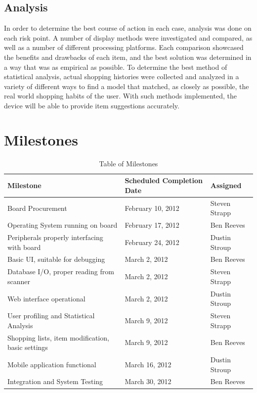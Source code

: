 \documentclass[11pt]{article} %
\begin{document}
\subsection {Analysis}
\noindent In order to determine the best course of action in each case, analysis was done on each risk point. A number of display methods were investigated and compared, as well as a number of different processing platforms. Each comparison showcased the benefits and drawbacks of each item, and the best solution was determined in a way that was as empirical as possible. To determine the best method of statistical analysis, actual shopping histories were collected and analyzed in a variety of different ways to find a model that matched, as closely as possible, the real world shopping habits of the user. With such methods implemented, the device will be able to provide item suggestions accurately.

\section{Milestones}
\begin{table}[h!]
\caption{Table of Milestones}
\begin{center}
\begin{tabular}{| p{6 cm} | p{4.5 cm} | p{4.5 cm}|}
\hline
\textbf{Milestone} & \textbf{Scheduled Completion Date} & \textbf{Assigned} \\
\hline
Board Procurement & February 10, 2012 & Steven Strapp\\
\hline
Operating System running on board & February 17, 2012 & Ben Reeves \\
\hline
Peripherals properly interfacing with board & February 24, 2012 & Dustin Stroup \\
\hline
Basic UI, suitable for debugging & March 2, 2012 & Ben Reeves\\
\hline
Database I/O, proper reading from scanner & March 2, 2012 & Steven Strapp \\
\hline
Web interface operational & March 2, 2012 & Dustin Stroup \\
\hline
User profiling and Statistical Analysis & March 9, 2012 & Steven Strapp \\
\hline
Shopping lists, item modification, basic settings & March 9, 2012 & Ben Reeves \\
\hline 
Mobile application functional & March 16, 2012 & Dustin Stroup \\
\hline
Integration and System Testing & March 30, 2012 & Ben Reeves \\
\hline

\end{tabular}
\label {MilestoneTable}
\end{center}
\end{table}
\end{document}
